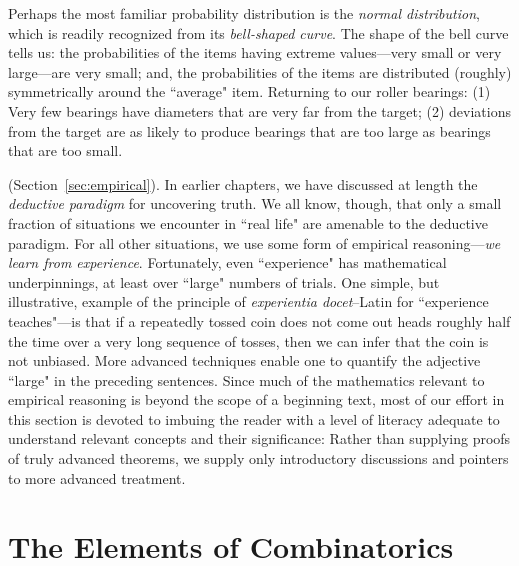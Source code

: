 Perhaps the most familiar probability distribution is the {\it normal distribution}, which is readily recognized from its {\it bell-shaped curve}.  The shape of the bell curve tells us: the probabilities of the items having extreme values---very small or very large---are very small; and, the probabilities of the items are distributed (roughly) symmetrically around the ``average" item.  Returning to our roller bearings: (1) Very few bearings have diameters that are very far from the target; (2) deviations from the target are as likely to produce bearings that are too large as bearings that are too small.

\medskip

 

 (Section~\ref{sec:empirical}).
In earlier chapters, we have discussed at length the {\em deductive paradigm} for uncovering truth.  We all know, though, that only a small fraction of situations we encounter in ``real life" are amenable to the deductive paradigm.  For all other situations, we use some form of empirical reasoning---{\em we learn from experience}.  Fortunately, even ``experience" has mathematical underpinnings, at least over ``large" numbers of trials.  One simple, but illustrative, example of the principle of {\em experientia docet}--Latin for ``experience teaches"---is that if a repeatedly tossed coin does not come out {\sc head}s roughly half the time over a very long sequence of tosses, then we can infer that the coin is not unbiased.  More advanced techniques enable one to quantify the adjective ``large" in the preceding sentences.  Since much of the mathematics relevant to empirical reasoning is beyond the scope of a beginning text, most of our effort in this section is devoted to imbuing the reader with a level of literacy adequate to understand relevant concepts and their significance:  Rather than supplying proofs of truly advanced theorems, we supply only introductory discussions and pointers to more advanced treatment.

\section{The Elements of Combinatorics}
\label{sec:counting}

